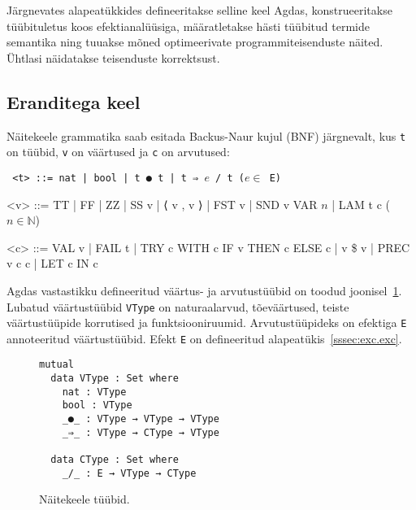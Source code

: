 \documentclass[a4paper,12pt]{article}
\begin{document}
Järgnevates alapeatükkides defineeritakse selline keel Agdas,
konstrueeritakse tüübituletus koos efektianalüüsiga,
määratletakse hästi tüübitud termide semantika
ning tuuakse mõned optimeerivate programmiteisenduste näited.
Ühtlasi näidatakse teisenduste korrektsust.

\subsection{Eranditega keel}\label{ssec:exc.raw}

Näitekeele grammatika saab esitada Backus-Naur kujul (BNF) järgnevalt, kus {\tt t} on tüübid, {\tt v} on väärtused ja {\tt c} on arvutused:
\begin{adjustwidth}{1em}{0pt}
\begin{grammar}\tt
<t> ::= nat | bool | t ● t | t ⇒ $e$ / t \hfill ($e \in$ E)
  
<v> ::= TT | FF | ZZ | SS v | ⟨ v , v ⟩ | FST v | SND v
    \alt VAR $n$ | LAM t c \hfill ($n \in \mathbb N$)
  
<c> ::= VAL v | FAIL t | TRY c WITH c
    \alt IF v THEN c ELSE c | v \$ v | PREC v c c | LET c IN c
\end{grammar}
\end{adjustwidth}
Agdas vastastikku defineeritud väärtus- ja arvutustüübid on toodud joonisel~\ref{fig:exc.types}.
Lubatud väärtustüübid {\tt VType} on naturaalarvud, tõeväärtused, teiste väärtustüüpide korrutised ja funktsiooniruumid.
Arvutustüüpideks on efektiga {\tt E} annoteeritud väärtustüübid. Efekt {\tt E} on defineeritud alapeatükis~\ref{sssec:exc.exc}.
\begin{figure}
  \begin{BVerbatim}
mutual
  data VType : Set where
    nat : VType
    bool : VType
    _●_ : VType → VType → VType
    _⇒_ : VType → CType → VType

  data CType : Set where
    _/_ : E → VType → CType
  \end{BVerbatim}
  \caption{Näitekeele tüübid.}
  \label{fig:exc.types}
\end{figure}
\end{document}
